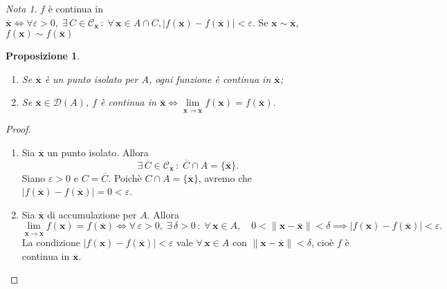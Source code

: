 \documentclass{article}
\theoremstyle{plain}
\newtheorem{prop}[thm]{Proposizione}
\theoremstyle{definition}
\theoremstyle{remark}
\newtheorem{note}{Nota}
\begin{document}
\vspace{10pt}

\begin{note}
$f$ è continua in $\overline{\mathbf{x}} \iff \forall\varepsilon>0,\;\exists\,C\in\mathcal{C}_{\overline{\mathbf{x}}}\,:\; 
\forall\, \mathbf{x}\in A\cap C, |f(\mathbf{x})-f(\overline{\mathbf{x}})|<\varepsilon.$
Se $\mathbf{x}\sim \overline{\mathbf{x}}$, $f(\mathbf{x})\sim f(\overline{\mathbf{x}})$
\end{note}

\vspace{10pt}

\begin{bxthm}
\begin{prop}\hfill
\begin{enumerate}
    \item Se $\overline{\mathbf{x}}$ è un punto isolato per $A$, ogni funzione è continua in $\overline{\mathbf{x}}$;
    \item Se $\overline{\mathbf{x}}\in\mathcal{D}(A)$, $f$ è continua in $\overline{\mathbf{x}} \iff \lim\limits_{\mathbf{x}\to \overline{\mathbf{x}}}f(\mathbf{x})=f(\overline{\mathbf{x}})$.
\end{enumerate}
\end{prop}
\end{bxthm}
\begin{proof}\hfill 
    \begin{enumerate}
        \item Sia $\overline{\mathbf{x}}$ un punto isolato. Allora 
        \[\exists\,\overline{C}\in\mathcal{C}_{\overline{\mathbf{x}}}\,:\;\overline{C}\cap A=\{\overline{\mathbf{x}}\}.\]
        Siano $\varepsilon>0$ e  $C=\overline{C}$. Poichè $C\cap A=\{\overline{\mathbf{x}}\}$, avremo che $|f(\overline{\mathbf{x}})-f(\overline{\mathbf{x}})|=0<\varepsilon$.
        \item Sia $\overline{\mathbf{x}}$ di accumulazione per $A$. Allora 
        \[\lim_{\mathbf{x}\to \overline{\mathbf{x}}} f(\mathbf{x})=f(\overline{\mathbf{x}})\iff \forall\,\varepsilon>0,\;\exists\,\delta>0\,:\; \forall\, \mathbf{x}\in A,\quad 0<\|\mathbf{x}-\overline{\mathbf{x}}\|<\delta\implies |f(\mathbf{x})-f(\overline{\mathbf{x}})|<\varepsilon.\] 
        La condizione $|f(\mathbf{x})-f(\overline{\mathbf{x}})|<\varepsilon$ vale $\forall\, \mathbf{x}\in A$ con $\| \mathbf{x}-\overline{\mathbf{x}} \|<\delta$, cioè $f$ è continua in $\overline{\mathbf{x}}$.
    \end{enumerate}
\end{proof}
\end{document}
